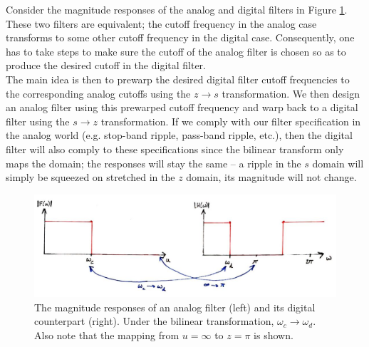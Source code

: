 %
Consider the magnitude responses of the analog and digital filters in
Figure \ref{fig::lecture_18_prewarp}. These two filters are equivalent;
the cutoff frequency in the analog case transforms to some other
cutoff frequency in the digital case. Consequently, one has to take
steps to make sure the cutoff of the analog filter is chosen so as
to produce the desired cutoff in the digital filter.\\
%
The main idea is then to prewarp the desired digital filter cutoff
frequencies to the corresponding analog cutoffs using the $z\rightarrow s$
transformation. We then design an analog filter using this prewarped
cutoff frequency and warp back to a digital filter using the $s\rightarrow z$
transformation. If we comply with our filter specification in the
analog world (e.g. stop-band ripple, pass-band ripple, etc.), then
the digital filter will also comply to these specifications since
the bilinear transform only maps the domain; the responses will
stay the same -- a ripple in the $s$ domain will simply be squeezed
on stretched in the $z$ domain, its magnitude will not change.
%
\begin{figure}[!htb]
  \includegraphics[width=\textwidth]{images/lecture_18_prewarp.JPG}
  \caption{The magnitude responses of an analog filter (left) and its
    digital counterpart (right). Under the
    bilinear transformation, $\omega_c\rightarrow\omega_d$. Also note
    that the mapping from $u=\infty$ to $z=\pi$ is shown.
  }
  \label{fig::lecture_18_prewarp}
\end{figure}
%
